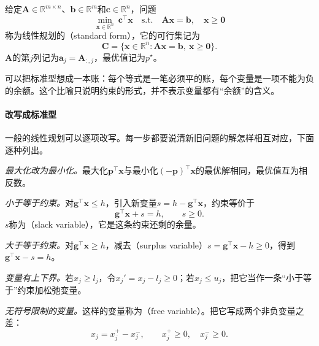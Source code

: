\begin{definition}[线性规划的标准型]
 \label{def:lp-standard}
 给定$\bm{A}\in\mathbb{R}^{m\times n}$、$\bm{b}\in\mathbb{R}^m$和$\bm{c}\in\mathbb{R}^n$，问题
 \begin{equation}
  \min_{\bm{x}\in\mathbb{R}^n}\ \bm{c}^\top\bm{x}
  \quad\text{s.t.}\quad\bm{A}\bm{x}=\bm{b},\quad\bm{x}\geq\bm{0}
  \label{eq:lp-standard}
 \end{equation}
 称为线性规划的（standard form），它的可行集记为
 \begin{equation}
  \bm{C}=\{\bm{x}\in\mathbb{R}^n:\bm{A}\bm{x}=\bm{b},\ \bm{x}\geq\bm{0}\}.
  \label{eq:lp-feasible-set}
 \end{equation}
 $\bm{A}$的第$j$列记为$\bm{a}_j=\bm{A}_{:,j}$，最优值记为$p^\star$。
\end{definition}

可以把标准型想成一本账：每个等式是一笔必须平的账，每个变量是一项不能为负的余额。这个比喻只说明约束的形式，并不表示变量都有“余额”的含义。

\paragraph{改写成标准型}
一般的线性规划可以逐项改写。每一步都要说清新旧问题的解怎样相互对应，下面逐种列出。

\emph{最大化改为最小化。}最大化$\bm{p}^\top\bm{x}$与最小化$(-\bm{p})^\top\bm{x}$的最优解相同，最优值互为相反数。

\emph{小于等于约束。}对$\bm{g}^\top\bm{x}\leq h$，引入新变量$s=h-\bm{g}^\top\bm{x}$，约束等价于
\begin{equation}
 \bm{g}^\top\bm{x}+s=h,\qquad s\geq0.
 \label{eq:lp-slack}
\end{equation}
$s$称为（slack variable），它是这条约束还剩的余量。

\emph{大于等于约束。}对$\bm{g}^\top\bm{x}\geq h$，减去（surplus variable）$s=\bm{g}^\top\bm{x}-h\geq0$，得到$\bm{g}^\top\bm{x}-s=h$。

\emph{变量有上下界。}若$x_j\geq l_j$，令$x_j'=x_j-l_j\geq0$；若$x_j\leq u_j$，把它当作一条“小于等于”约束加松弛变量。

\emph{无符号限制的变量。}这样的变量称为（free variable）。把它写成两个非负变量之差：
\begin{equation}
 x_j=x_j^{+}-x_j^{-},\qquad x_j^{+}\geq0,\quad x_j^{-}\geq0.
 \label{eq:lp-free-split}
\end{equation}

